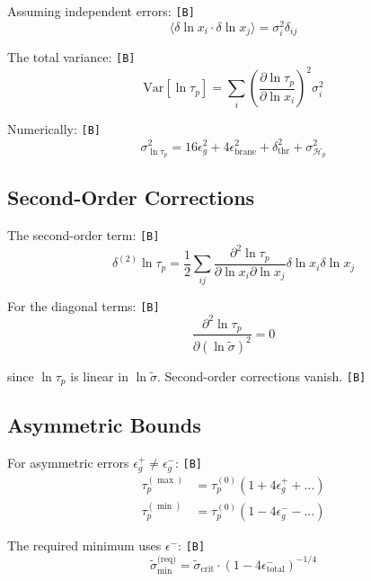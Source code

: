 \documentclass[11pt,a4paper]{article}
\newcommand{\tagB}{\textcolor{purple!70!black}{\texttt{[B]}}}
\theoremstyle{definition}
\begin{document}
Assuming independent errors: \tagB{}
\begin{equation}
\label{eq:corr-indep}
\langle\delta\ln x_i \cdot \delta\ln x_j\rangle = \sigma_i^2 \delta_{ij}
\end{equation}

The total variance: \tagB{}
\begin{equation}
\label{eq:corr-var}
\text{Var}[\ln\tau_p] = \sum_i \left(\frac{\partial\ln\tau_p}{\partial\ln x_i}\right)^2 \sigma_i^2
\end{equation}

Numerically: \tagB{}
\begin{equation}
\label{eq:corr-num}
\sigma_{\ln\tau_p}^2 = 16\epsilon_g^2 + 4\epsilon_{\text{brane}}^2 + \delta_{\text{thr}}^2 + \sigma_{\mathcal{H}_p}^2
\end{equation}

\subsection{Second-Order Corrections}
\label{subsec:second-order}

The second-order term: \tagB{}
\begin{equation}
\label{eq:second-1}
\delta^{(2)}\ln\tau_p = \frac{1}{2}\sum_{ij} \frac{\partial^2\ln\tau_p}{\partial\ln x_i \partial\ln x_j} \delta\ln x_i \delta\ln x_j
\end{equation}

For the diagonal terms: \tagB{}
\begin{equation}
\label{eq:second-diag}
\frac{\partial^2\ln\tau_p}{\partial(\ln\tilde{\sigma})^2} = 0
\end{equation}

since $\ln\tau_p$ is linear in $\ln\tilde{\sigma}$. Second-order corrections vanish. \tagB{}

\subsection{Asymmetric Bounds}
\label{subsec:asymmetric}

For asymmetric errors $\epsilon^+_g \neq \epsilon^-_g$: \tagB{}
\begin{align}
\label{eq:asym-upper}
\tau_p^{(\max)} &= \tau_p^{(0)}(1 + 4\epsilon^+_g + \ldots) \\
\label{eq:asym-lower}
\tau_p^{(\min)} &= \tau_p^{(0)}(1 - 4\epsilon^-_g - \ldots)
\end{align}

The required minimum uses $\epsilon^-$: \tagB{}
\begin{equation}
\label{eq:asym-min}
\tilde{\sigma}_{\min}^{\text{(req)}} = \tilde{\sigma}_{\text{crit}} \cdot (1 - 4\epsilon^-_{\text{total}})^{-1/4}
\end{equation}
\end{document}
